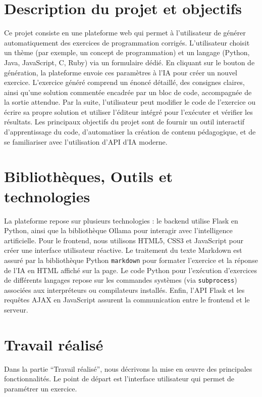 \documentclass[a4paper, 12pt, twoside]{article}
\begin{document}
\section{Description du projet et objectifs}

Ce projet consiste en une plateforme web qui permet à l'utilisateur de générer automatiquement des exercices de programmation corrigés. L'utilisateur choisit un thème (par exemple, un concept de programmation) et un langage (Python, Java, JavaScript, C, Ruby) via un formulaire dédié. En cliquant sur le bouton de génération, la plateforme envoie ces paramètres à l'IA pour créer un nouvel exercice. L'exercice généré comprend un énoncé détaillé, des consignes claires, ainsi qu'une solution commentée encadrée par un bloc de code, accompagnée de la sortie attendue. Par la suite, l'utilisateur peut modifier le code de l'exercice ou écrire sa propre solution et utiliser l'éditeur intégré pour l'exécuter et vérifier les résultats. Les principaux objectifs du projet sont de fournir un outil interactif d'apprentissage du code, d'automatiser la création de contenu pédagogique, et de se familiariser avec l'utilisation d'API d'IA moderne.

\section{Bibliothèques, Outils et technologies}

La plateforme repose sur plusieurs technologies : le backend utilise Flask en Python, ainsi que la bibliothèque Ollama pour interagir avec l'intelligence artificielle. Pour le frontend, nous utilisons HTML5, CSS3 et JavaScript pour créer une interface utilisateur réactive. Le traitement du texte Markdown est assuré par la bibliothèque Python \texttt{markdown} pour formater l'exercice et la réponse de l'IA en HTML affiché sur la page. Le code Python pour l'exécution d'exercices de différents langages repose sur les commandes systèmes (via \texttt{subprocess}) associées aux interpréteurs ou compilateurs installés. Enfin, l'API Flask et les requêtes AJAX en JavaScript assurent la communication entre le frontend et le serveur.

\section{Travail réalisé}

Dans la partie ``Travail réalisé'', nous décrivons la mise en œuvre des principales fonctionnalités. Le point de départ est l'interface utilisateur qui permet de paramétrer un exercice. 
\end{document}
